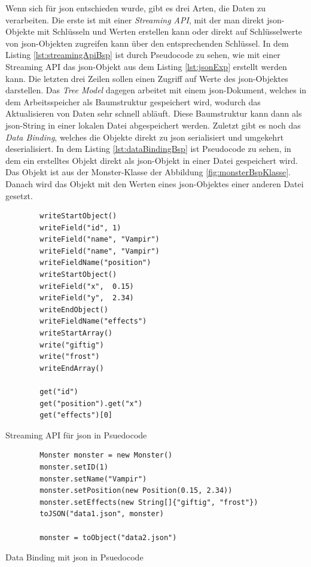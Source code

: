 Wenn sich für \ac{json} entschieden wurde, gibt es drei Arten, die Daten zu verarbeiten. Die erste ist mit einer \textit{Streaming API}, mit der man direkt \ac{json}-Objekte mit Schlüsseln und Werten erstellen kann oder direkt auf Schlüsselwerte von \ac{json}-Objekten zugreifen kann über den  entsprechenden Schlüssel. In dem Listing \ref{lst:streamingApiBsp} ist durch Pseudocode zu sehen, wie mit einer Streaming API das \ac{json}-Objekt aus dem Listing \ref{lst:jsonExp} erstellt werden kann. Die letzten drei Zeilen sollen einen Zugriff auf Werte des \ac{json}-Objektes darstellen.\cite{tutorialspointJacksonStreaming} Das \textit{Tree Model} dagegen arbeitet mit einem \ac{json}-Dokument, welches in dem Arbeitsspeicher als Baumstruktur gespeichert wird, wodurch das Aktualisieren von Daten sehr schnell abläuft. Diese Baumstruktur kann dann als \ac{json}-String in einer lokalen Datei abgespeichert werden. Zuletzt gibt es noch das \textit{Data Binding}, welches die Objekte direkt zu \ac{json} serialisiert und umgekehrt deserialisiert. In dem Listing \ref{lst:dataBindingBsp} ist Pseudocode zu sehen, in dem ein erstelltes Objekt direkt als \ac{json}-Objekt in einer Datei gespeichert wird. Das Objekt ist aus der Monster-Klasse der Abbildung \ref{fig:monsterBspKlasse}. Danach wird das Objekt mit den Werten eines \ac{json}-Objektes einer anderen Datei gesetzt.\cite{tutorialspointJacksonData}\cite{tutorialspointJacksonOverview}

\begin{listing}[htp]
    \begin{verbatim} 
        writeStartObject()
        writeField("id", 1)
        writeField("name", "Vampir")
        writeField("name", "Vampir")
        writeFieldName("position")
        writeStartObject()
        writeField("x",  0.15) 
        writeField("y",  2.34) 
        writeEndObject()
        writeFieldName("effects")
        writeStartArray()
        write("giftig") 
        write("frost")
        writeEndArray()

        get("id")
        get("position").get("x")
        get("effects")[0]
    \end{verbatim}
    \caption{Streaming API für \ac{json} in Psuedocode}
    \label{lst:streamingApiBsp}
\end{listing}

\begin{listing}[htp]
    \begin{verbatim} 
        Monster monster = new Monster()
        monster.setID(1)
        monster.setName("Vampir")
        monster.setPosition(new Position(0.15, 2.34))
        monster.setEffects(new String[]{"giftig", "frost"})
        toJSON("data1.json", monster)

        monster = toObject("data2.json")
    \end{verbatim}
    \caption{Data Binding mit \ac{json} in Psuedocode}
    \label{lst:dataBindingBsp}
\end{listing}

